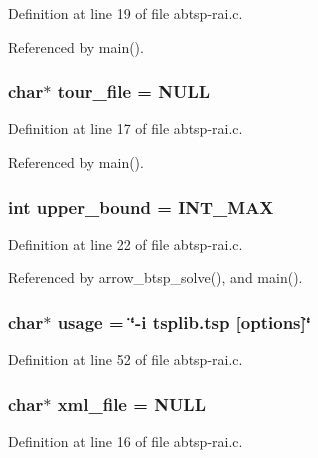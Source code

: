 Definition at line 19 of file abtsp-rai.c.

Referenced by main().\hypertarget{abtsp-rai_8c_b818a82f867be75d7c4d92d792b0943e}{
\subsubsection[{tour\_\-file}]{\setlength{\rightskip}{0pt plus 5cm}char$\ast$ {\bf tour\_\-file} = NULL}}
\label{abtsp-rai_8c_b818a82f867be75d7c4d92d792b0943e}




Definition at line 17 of file abtsp-rai.c.

Referenced by main().\hypertarget{abtsp-rai_8c_f5a34eb1d01ffd792adcadc9627ffcb8}{
\subsubsection[{upper\_\-bound}]{\setlength{\rightskip}{0pt plus 5cm}int {\bf upper\_\-bound} = INT\_\-MAX}}
\label{abtsp-rai_8c_f5a34eb1d01ffd792adcadc9627ffcb8}




Definition at line 22 of file abtsp-rai.c.

Referenced by arrow\_\-btsp\_\-solve(), and main().\hypertarget{abtsp-rai_8c_adebe2487a2c5240ab6cd02c83add0bf}{
\subsubsection[{usage}]{\setlength{\rightskip}{0pt plus 5cm}char$\ast$ {\bf usage} = \char`\"{}-i tsplib.tsp \mbox{[}{\bf options}\mbox{]}\char`\"{}}}
\label{abtsp-rai_8c_adebe2487a2c5240ab6cd02c83add0bf}




Definition at line 52 of file abtsp-rai.c.\hypertarget{abtsp-rai_8c_bf4e392494984c6ef8259268eb1fe421}{
\subsubsection[{xml\_\-file}]{\setlength{\rightskip}{0pt plus 5cm}char$\ast$ {\bf xml\_\-file} = NULL}}
\label{abtsp-rai_8c_bf4e392494984c6ef8259268eb1fe421}




Definition at line 16 of file abtsp-rai.c.